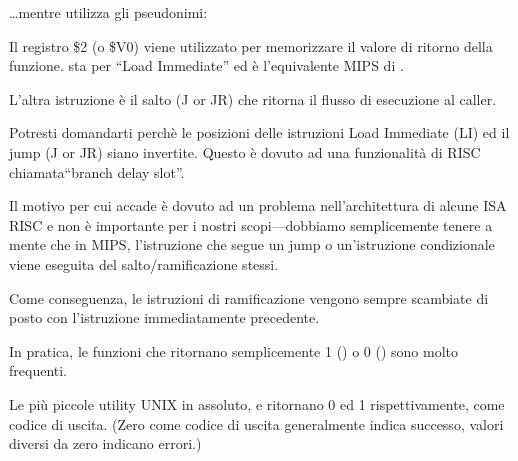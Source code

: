 \dots mentre \IDA utilizza gli pseudonimi:



Il registro \$2 (o \$V0) viene utilizzato per memorizzare il valore di ritorno della funzione.
 sta per ``Load Immediate'' ed è l'equivalente MIPS di \MOV.

L'altra istruzione è il salto (J or JR) che ritorna il flusso di esecuzione al \gls{caller}.

Potresti domandarti perchè le posizioni delle istruzioni Load Immediate (LI) ed il jump (J or JR) siano invertite. Questo è dovuto ad una funzionalità di \ac{RISC} chiamata``branch delay slot''.

Il motivo per cui accade è dovuto ad un problema nell'architettura di alcune \ac{ISA} RISC e non è importante per i nostri
scopi---dobbiamo semplicemente tenere a mente che in MIPS, l'istruzione che segue un jump o un'istruzione condizionale
viene eseguita  del salto/ramificazione stessi.

Come conseguenza, le istruzioni di ramificazione vengono sempre scambiate di posto con l'istruzione immediatamente precedente.

In pratica, le funzioni che ritornano semplicemente 1 () o 0 () sono molto frequenti.

Le più piccole utility UNIX in assoluto,  e  ritornano 0 ed 1 rispettivamente, come codice di uscita.
(Zero come codice di uscita generalmente indica successo, valori diversi da zero indicano errori.)
